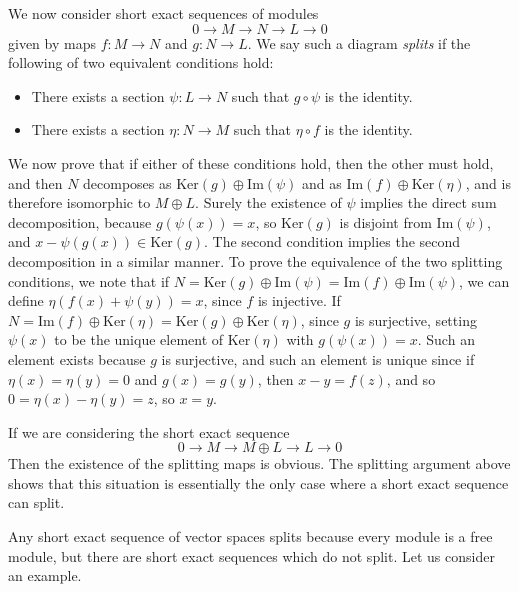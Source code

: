 We now consider short exact sequences of modules
%
\[ 0 \to M \to N \to L \to 0 \]
%
given by maps $f: M \to N$ and $g: N \to L$. We say such a diagram \emph{splits} if the following of two equivalent conditions hold:
%
\begin{itemize}
    \item There exists a section $\psi: L \to N$ such that $g \circ \psi$ is the identity.

    \item There exists a section $\eta: N \to M$ such that $\eta \circ f$ is the identity.
\end{itemize}
%
We now prove that if either of these conditions hold, then the other must hold, and then $N$ decomposes as $\text{Ker}(g) \oplus \text{Im}(\psi)$ and as $\text{Im}(f) \oplus \text{Ker}(\eta)$, and is therefore isomorphic to $M \oplus L$. Surely the existence of $\psi$ implies the direct sum decomposition, because $g(\psi(x)) = x$, so $\text{Ker}(g)$ is disjoint from $\text{Im}(\psi)$, and $x - \psi(g(x)) \in \text{Ker}(g)$. The second condition implies the second decomposition in a similar manner. To prove the equivalence of the two splitting conditions, we note that if $N = \text{Ker}(g) \oplus \text{Im}(\psi) = \text{Im}(f) \oplus \text{Im}(\psi)$, we can define $\eta(f(x) + \psi(y)) = x$, since $f$ is injective. If $N = \text{Im}(f) \oplus \text{Ker}(\eta) = \text{Ker}(g) \oplus \text{Ker}(\eta)$, since $g$ is surjective, setting $\psi(x)$ to be the unique element of $\text{Ker}(\eta)$ with $g(\psi(x)) = x$. Such an element exists because $g$ is surjective, and such an element is unique since if $\eta(x) = \eta(y) = 0$ and $g(x) = g(y)$, then $x - y = f(z)$, and so $0 = \eta(x) - \eta(y) = z$, so $x = y$.

\begin{remark}
    If we are considering the short exact sequence
    \[ 0 \to M \to M \oplus L \to L \to 0 \]
    Then the existence of the splitting maps is obvious. The splitting argument above shows that this situation is essentially the only case where a short exact sequence can split.
\end{remark}

Any short exact sequence of vector spaces splits because every module is a free module, but there are short exact sequences which do not split. Let us consider an example.

